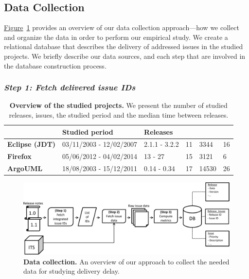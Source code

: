 \subsection{Data Collection}

\hyperref[ch4:fig:overview]{Figure}~\ref{ch4:fig:overview} provides an overview of our
data collection approach---how we collect and organize the data in order to
perform our empirical study. We create a relational database that describes the
delivery of addressed issues in the studied projects. We briefly describe our
data sources, and each step that are involved in the database construction process. 

\subsubsection*{\textbf{\textit{Step 1: Fetch delivered issue IDs}}}


\begin{table}
	\footnotesize
	\caption{\textbf{Overview of the studied projects.} We present the number
	of studied releases, issues, the studied period and the median time
	between releases.}
	\label{ch4:tbl:consideredReleases}
	\begin{tabular}{L{1.65cm}C{2.5cm}C{1.5cm}C{1.0cm}R{2.45cm}R{4.25cm}}
		\hline 
		 & \textbf{Studied period} &
		\textbf{Releases} & 
		& 
		 & \tabularnewline
		\hline 
		\hline 
		\textbf{Eclipse (JDT)} & 03/11/2003 - 12/02/2007 & 2.1.1
		- 3.2.2 & 11 & 3344 & 16\tabularnewline
		\hline 
		\textbf{Firefox} & 05/06/2012 - 04/02/2014 & 13 - 27 &
		15 & 3121 & 6\tabularnewline
		\hline 
		\textbf{ArgoUML} & 18/08/2003 - 15/12/2011 & 0.14 - 0.34
		& 17 & 14530 & 26 \tabularnewline
		\hline 
	\end{tabular}
\end{table}

\begin{figure}
	\centering
	\includegraphics[width=\textwidth]{chapters/chapter4/figures/database_construction.pdf}
	\caption{\textbf{Data collection.} An overview of our approach to
	collect the needed data for studying delivery delay.}
	\label{ch4:fig:overview}
\end{figure} 

